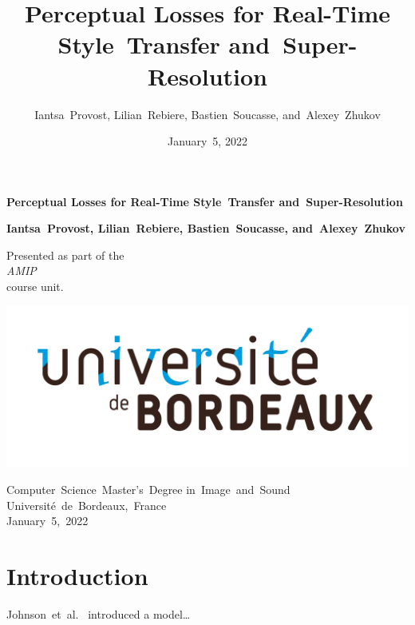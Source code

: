 \documentclass{article}
\title{Perceptual Losses for Real-Time Style~Transfer and~Super-Resolution}
\author{Iantsa~Provost, Lilian~Rebiere, Bastien~Soucasse, and~Alexey~Zhukov}
\date{January~5, 2022}
\begin{document}
{
    \begin{titlepage}
        \begin{center}
            \vspace*{1.5cm}
            
            \Large
            
            \textbf{Perceptual Losses for Real-Time Style~Transfer and~Super-Resolution}
            
            \vspace{.5cm}
            
            \vspace{1.5cm}
            
            \large
            
            \textbf{Iantsa~Provost, Lilian~Rebiere, Bastien~Soucasse, and~Alexey~Zhukov}
            
            \vfill
            
            \normalsize
            
            Presented as part of the\\
            \textit{AMIP}\\
            course unit.
            
            \vspace{1.5cm}
            
            \includegraphics[width=.5\textwidth]{images/college-logo.jpg}
            
            Computer~Science~Master's~Degree in~Image~and~Sound\\
            Université~de~Bordeaux,~France\\
            January~5,~2022
        \end{center}
    \end{titlepage}
    \newpage
    \setcounter{page}{2}
}

{
    \hypersetup{linkcolor=black}
    \tableofcontents
    \newpage
}

{
    \section{Introduction}
    \label{sec:introduction}

    Johnson~et~al.~\cite{https://doi.org/10.48550/arxiv.1603.08155} introduced a model…
}
\end{document}
